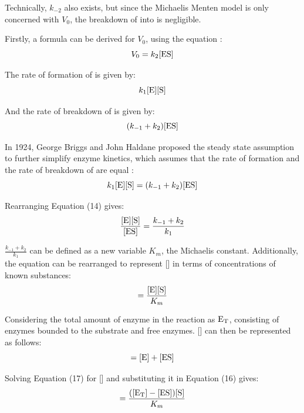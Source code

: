 \documentclass{article}
\begin{document}
\medskip

Technically, $k_{-2}$ also exists, but since the Michaelis Menten model is only concerned with $V_0$, the breakdown of  into  is negligible.

\medskip

Firstly, a formula can be derived for $V_0$, using the equation :
\begin{equation}
    V_0 = k_2[\ce{ES}]
\end{equation}

The rate of formation of  is given by:
\begin{equation}
    k_1[\ce{E}][\ce{S}]
\end{equation}

And the rate of breakdown of  is given by:
\begin{equation}
    (k_{-1} + k_2) [\ce{ES}]
\end{equation}

In 1924, George Briggs and John Haldane proposed the steady state assumption to further simplify enzyme kinetics, which assumes that the rate of formation and the rate of breakdown of  are equal \parencite{biochem}:
\begin{equation}
    k_1[\ce{E}][\ce{S}] = (k_{-1} + k_2) [\ce{ES}]
\end{equation}

Rearranging Equation (14) gives:
\begin{equation}
    \frac{[\ce{E}][\ce{S}]}{[\ce{ES}]} = \frac{k_{-1}+k_2}{k_1}
\end{equation}

$\frac{k_{-1}+k_2}{k_1}$ can be defined as a new variable $K_m$, the Michaelis constant. Additionally, the equation can be rearranged to represent [] in terms of concentrations of known substances:
\begin{equation}
    [\ce{ES}] = \frac{[\ce{E}][\ce{S}]}{K_m}
\end{equation}

Considering the total amount of enzyme in the reaction as $\ce{E_T}$, consisting of enzymes bounded to the substrate and free enzymes. [] can then be represented as follows:
\begin{equation}
    [\ce{E_T}] = [\ce{E}] + [\ce{ES}]
\end{equation}

Solving Equation (17) for [] and substituting it in Equation (16) gives:
\begin{equation}
    [\ce{ES}] = \frac{([\ce{E_T}] - [\ce{ES}]) [\ce{S}]}{K_m}
\end{equation}
\end{document}
